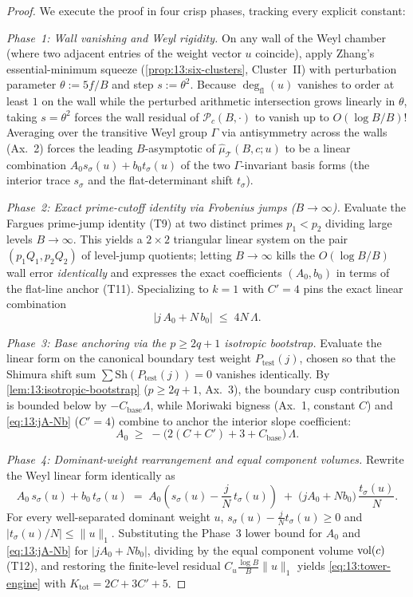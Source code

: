 \begin{proof}
We execute the proof in four crisp phases, tracking every explicit constant:

\emph{Phase~1: Wall vanishing and Weyl rigidity.}
On any wall of the Weyl chamber (where two adjacent entries of the weight vector $u$ coincide), apply Zhang's essential-minimum squeeze (\cref{prop:13:six-clusters}, Cluster~II) with perturbation parameter $\theta := 5 f / B$ and step $s := \theta^2$. Because $\deg_{\mathrm{fl}}(u)$ vanishes to order at least $1$ on the wall while the perturbed arithmetic intersection grows linearly in $\theta$, taking $s = \theta^2$ forces the wall residual of $\mathcal{P}_c(B, \cdot)$ to vanish up to $O(\log B / B)$! Averaging over the transitive Weyl group $\Gamma$ via antisymmetry across the walls (Ax.~2) forces the leading $B$-asymptotic of $\widehat{\mu}_{\mathcal{T}}(B, c; u)$ to be a linear combination $A_0 s_\sigma(u) + b_0 t_\sigma(u)$ of the two $\Gamma$-invariant basis forms (the interior trace $s_\sigma$ and the flat-determinant shift $t_\sigma$).

\emph{Phase~2: Exact prime-cutoff identity via Frobenius jumps ($B \to \infty$).}
Evaluate the Fargues prime-jump identity (T9) at two distinct primes $p_1 < p_2$ dividing large levels $B \to \infty$. This yields a $2 \times 2$ triangular linear system on the pair $(p_1 Q_1, p_2 Q_2)$ of level-jump quotients; letting $B \to \infty$ kills the $O(\log B / B)$ wall error \emph{identically} and expresses the exact coefficients $(A_0, b_0)$ in terms of the flat-line anchor (T11). Specializing to $k = 1$ with $C' = 4$ pins the exact linear combination
\begin{equation}
\label{eq:13:jA-Nb}
  \bigl|j\, A_0 + N\, b_0\bigr| \;\le\; 4 N\,\Lambda.
\end{equation}

\emph{Phase~3: Base anchoring via the $p \ge 2q + 1$ isotropic bootstrap.}
Evaluate the linear form on the canonical boundary test weight $P_{\mathrm{test}}(j)$, chosen so that the Shimura shift sum $\sum \mathrm{Sh}(P_{\mathrm{test}}(j)) = 0$ vanishes identically. By \cref{lem:13:isotropic-bootstrap} ($p \ge 2q + 1$, Ax.~3), the boundary cusp contribution is bounded below by $-C_{\mathrm{base}}\Lambda$, while Moriwaki bigness (Ax.~1, constant $C$) and \eqref{eq:13:jA-Nb} ($C' = 4$) combine to anchor the interior slope coefficient:
\[
  A_0 \;\ge\; -\bigl(2(C + C') + 3 + C_{\mathrm{base}}\bigr)\,\Lambda.
\]

\emph{Phase~4: Dominant-weight rearrangement and equal component volumes.}
Rewrite the Weyl linear form identically as
\[
  A_0\, s_\sigma(u) + b_0\, t_\sigma(u)
  \;=\; A_0\!\left(s_\sigma(u) - \frac{j}{N}\, t_\sigma(u)\right) \;+\; \bigl(j A_0 + N b_0\bigr)\,\frac{t_\sigma(u)}{N}.
\]
For every well-separated dominant weight $u$, $s_\sigma(u) - \frac{j}{N} t_\sigma(u) \ge 0$ and $|t_\sigma(u)/N| \le \|u\|_1$. Substituting the Phase~3 lower bound for $A_0$ and \eqref{eq:13:jA-Nb} for $|j A_0 + N b_0|$, dividing by the equal component volume $\operatorname{vol}(c)$ (T12), and restoring the finite-level residual $C_u \frac{\log B}{B}\|u\|_1$ yields \eqref{eq:13:tower-engine} with $K_{\mathrm{tot}} = 2C + 3C' + 5$.
\end{proof}

